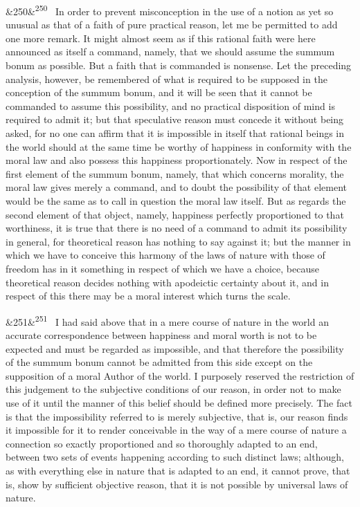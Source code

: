 \documentclass[12pt]{article}
\newcommand{\para}[1][]{\par\noindent\ifx&#1&\else\textsuperscript{\footnotesize #1}~\fi}
\begin{document}
\para[250] In order to prevent misconception in the use of a notion as yet so unusual as that of a faith of pure practical reason, let me be permitted to add one more remark. It might almost seem as if this rational faith were here announced as itself a command, namely, that we should assume the summum bonum as possible. But a faith that is commanded is nonsense. Let the preceding analysis, however, be remembered of what is required to be supposed in the conception of the summum bonum, and it will be seen that it cannot be commanded to assume this possibility, and no practical disposition of mind is required to admit it; but that speculative reason must concede it without being asked, for no one can affirm that it is impossible in itself that rational beings in the world should at the same time be worthy of happiness in conformity with the moral law and also possess this happiness proportionately. Now in respect of the first element of the summum bonum, namely, that which concerns morality, the moral law gives merely a command, and to doubt the possibility of that element would be the same as to call in question the moral law itself. But as regards the second element of that object, namely, happiness perfectly proportioned to that worthiness, it is true that there is no need of a command to admit its possibility in general, for theoretical reason has nothing to say against it; but the manner in which we have to conceive this harmony of the laws of nature with those of freedom has in it something in respect of which we have a choice, because theoretical reason decides nothing with apodeictic certainty about it, and in respect of this there may be a moral interest which turns the scale.

\para[251] I had said above that in a mere course of nature in the world an accurate correspondence between happiness and moral worth is not to be expected and must be regarded as impossible, and that therefore the possibility of the summum bonum cannot be admitted from this side except on the supposition of a moral Author of the world. I purposely reserved the restriction of this judgement to the subjective conditions of our reason, in order not to make use of it until the manner of this belief should be defined more precisely. The fact is that the impossibility referred to is merely subjective, that is, our reason finds it impossible for it to render conceivable in the way of a mere course of nature a connection so exactly proportioned and so thoroughly adapted to an end, between two sets of events happening according to such distinct laws; although, as with everything else in nature that is adapted to an end, it cannot prove, that is, show by sufficient objective reason, that it is not possible by universal laws of nature.
\end{document}
